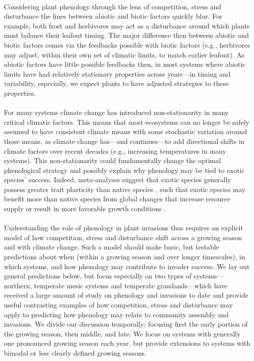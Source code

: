 \documentclass[11pt,a4paper,oneside]{article}
\begin{document}
\\ 
Considering plant phenology through the lens of competition, stress and disturbance the lines between abiotic and biotic factors quickly blur. For example, both frost and herbivores may act as a disturbance around which plants must balance their leafout timing. The major difference then between abiotic and biotic factors comes via the feedbacks possible with biotic factors (e.g., herbivores may adjust, within their own set of climatic limits, to match earlier leafout). As abiotic factors have little possible feedbacks then, in most systems where abiotic limits have had relatively stationary properties across years---in timing and variability, especially, we expect plants to have adjusted strategies to these properties.\\
\\
For many systems climate change has introduced non-stationarity in many critical climatic factors. This means that most ecosystems can no longer be safely assumed to have consistent climate means with some stochastic variation around those means, as climate change has---and continues---to add directional shifts in climate factors over recent decades (e.g., increasing temperatures in many systems). This non-stationarity could fundamentally change the optimal phenological strategy and possibly explain why phenology may be tied to exotic species' success. Indeed, meta-analyses suggest that exotic species generally possess greater trait plasticity than native species \citep{Davidson2011}, such that exotic species may benefit more than native species from global changes that increase resource supply or result in more favorable growth conditions \citep{Richards:2006si}.\\
\\
Understanding the role of phenology in plant invasions thus requires an explicit model of how competition, stress and disturbance shift across a growing season and with climate change. Such a model should make basic, but testable predictions about when (within a growing season and over longer timescales), in which systems, and how phenology may contribute to invader success. We lay out general predictions below, but focus especially on two types of systems---northern, temperate mesic systems and temperate grasslands---which have received a large amount of study on phenology and invasions to date and provide useful contrasting examples of how competition, stress and disturbance may apply to predicting how phenology may relate to community assembly and invasions. We divide our discussion temporally: focusing first the early portion of the growing season, then middle, and late. We focus on systems with generally one pronounced growing season each year, but provide extensions to systems with bimodal or less clearly defined growing seasons.\\
\end{document}
